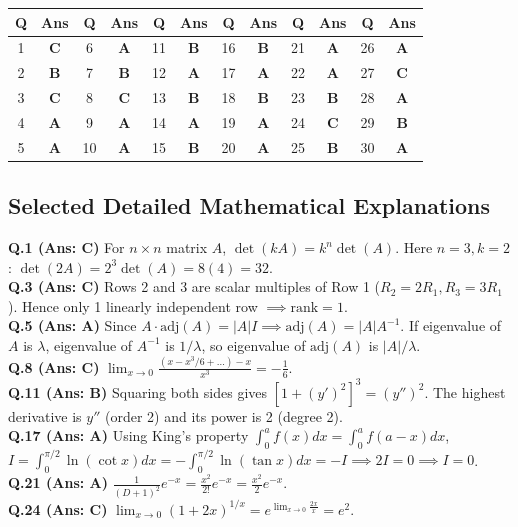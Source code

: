 \begin{center}
\begin{tabular}{|c|c||c|c||c|c||c|c||c|c||c|c|}
\hline
\textbf{Q} & \textbf{Ans} & \textbf{Q} & \textbf{Ans} & \textbf{Q} & \textbf{Ans} & \textbf{Q} & \textbf{Ans} & \textbf{Q} & \textbf{Ans} & \textbf{Q} & \textbf{Ans} \\
\hline
1 & \textbf{C} & 6 & \textbf{A} & 11 & \textbf{B} & 16 & \textbf{B} & 21 & \textbf{A} & 26 & \textbf{A} \\
2 & \textbf{B} & 7 & \textbf{B} & 12 & \textbf{A} & 17 & \textbf{A} & 22 & \textbf{A} & 27 & \textbf{C} \\
3 & \textbf{C} & 8 & \textbf{C} & 13 & \textbf{B} & 18 & \textbf{B} & 23 & \textbf{B} & 28 & \textbf{A} \\
4 & \textbf{A} & 9 & \textbf{A} & 14 & \textbf{A} & 19 & \textbf{A} & 24 & \textbf{C} & 29 & \textbf{B} \\
5 & \textbf{A} & 10 & \textbf{A} & 15 & \textbf{B} & 20 & \textbf{A} & 25 & \textbf{B} & 30 & \textbf{A} \\
\hline
\end{tabular}
\end{center}

\vspace{3mm}
\subsection*{Selected Detailed Mathematical Explanations}

\begin{solutionbox}
\textbf{Q.1 (Ans: C)} For $n\times n$ matrix $A$, $\det(kA) = k^n \det(A)$. Here $n=3, k=2$: $\det(2A) = 2^3 \det(A) = 8(4) = 32$.\\[2mm]
\textbf{Q.3 (Ans: C)} Rows 2 and 3 are scalar multiples of Row 1 ($R_2 = 2R_1, R_3 = 3R_1$). Hence only 1 linearly independent row $\implies \text{rank} = 1$.\\[2mm]
\textbf{Q.5 (Ans: A)} Since $A \cdot \text{adj}(A) = |A|I \implies \text{adj}(A) = |A|A^{-1}$. If eigenvalue of $A$ is $\lambda$, eigenvalue of $A^{-1}$ is $1/\lambda$, so eigenvalue of $\text{adj}(A)$ is $|A|/\lambda$.\\[2mm]
\textbf{Q.8 (Ans: C)} $\lim_{x\to 0} \frac{(x - x^3/6 + \dots) - x}{x^3} = -\frac{1}{6}$.\\[2mm]
\textbf{Q.11 (Ans: B)} Squaring both sides gives $[1 + (y')^2]^3 = (y'')^2$. The highest derivative is $y''$ (order 2) and its power is 2 (degree 2).\\[2mm]
\textbf{Q.17 (Ans: A)} Using King's property $\int_0^a f(x)dx = \int_0^a f(a-x)dx$, $I = \int_0^{\pi/2} \ln(\cot x)dx = -\int_0^{\pi/2} \ln(\tan x)dx = -I \implies 2I = 0 \implies I = 0$.\\[2mm]
\textbf{Q.21 (Ans: A)} $\frac{1}{(D+1)^2}e^{-x} = \frac{x^2}{2!}e^{-x} = \frac{x^2}{2}e^{-x}$.\\[2mm]
\textbf{Q.24 (Ans: C)} $\lim_{x\to 0} (1+2x)^{1/x} = e^{\lim_{x\to 0} \frac{2x}{x}} = e^2$.
\end{solutionbox}

\newpage
